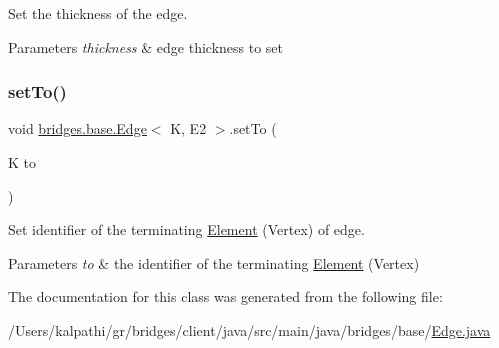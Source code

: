 Set the thickness of the edge. 


\begin{DoxyParams}{Parameters}
{\em thickness} & edge thickness to set \\
\hline
\end{DoxyParams}
\mbox{\label{classbridges_1_1base_1_1_edge_a5e574139711be3f96c42da02a2702aea}} 
\subsubsection{\texorpdfstring{set\+To()}{setTo()}}
{\footnotesize\ttfamily void \mbox{\hyperlink{classbridges_1_1base_1_1_edge}{bridges.\+base.\+Edge}}$<$ K, E2 $>$.set\+To (\begin{DoxyParamCaption}\item[{K}]{to }\end{DoxyParamCaption})}



Set identifier of the terminating \mbox{\hyperlink{classbridges_1_1base_1_1_element}{Element}} (Vertex) of edge. 


\begin{DoxyParams}{Parameters}
{\em to} & the identifier of the terminating \mbox{\hyperlink{classbridges_1_1base_1_1_element}{Element}} (Vertex) \\
\hline
\end{DoxyParams}


The documentation for this class was generated from the following file\+:\begin{DoxyCompactItemize}
\item 
/\+Users/kalpathi/gr/bridges/client/java/src/main/java/bridges/base/\mbox{\hyperlink{_edge_8java}{Edge.\+java}}\end{DoxyCompactItemize}
